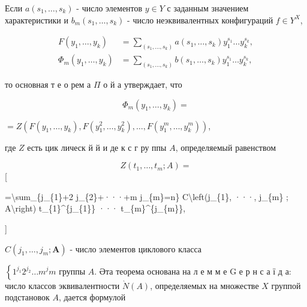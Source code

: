 \documentclass[10pt]{article}
\begin{document}
Если $a\left(s_{1}, \ldots, s_{k}\right)$ - число элементов $y \in Y$ с заданным значением характеристики и $b_{m}\left(s_{1}, \ldots, s_{k}\right)$ - число неэквивалентных конфигураций $f \in Y^{X}$,



\[

\begin{aligned}

F\left(y_{1}, \ldots, y_{k}\right) & =\sum_{\left(s_{1}, \ldots, s_{k}\right)} a\left(s_{1}, \ldots, s_{k}\right) y_{1}^{s_{1}} \ldots y_{k}^{s_{k}}, \\

\Phi_{m}\left(y_{1}, \ldots, y_{k}\right) & =\sum_{\left(s_{1}, \ldots, s_{k}\right)} b\left(s_{1}, \ldots, s_{k}\right) y_{1}^{s_{1}} \ldots y_{k}^{s_{k}},

\end{aligned}

\]



то основная т е о рем а $\Pi$ о й а утверждает, что



\[

\Phi_{m}\left(y_{1}, \ldots, y_{k}\right)=

\]



$=Z\left(F\left(y_{1}, \ldots, y_{k}\right), F\left(y_{1}^{2}, \ldots, y_{k}^{2}\right), \ldots, F\left(y_{1}^{m}, \ldots, y_{k}^{m}\right)\right)$,



где $Z$ есть цик лическ й й и де к с г ру ппы $A$, определяемый равенством



\[

Z\left(t_{1}, \ldots, t_{m} ; A\right)=

\][



=\textbackslash sum\_\{j\_\{1\}+2 j\_\{2\}+···+m j\_\{m\}=n\} C\textbackslash left(j\_\{1\}, ···, j\_\{m\} ; A\textbackslash right) t\_\{1\}\^{}\{j\_\{1\}\} ··· t\_\{m\}\^{}\{j\_\{m\}\},

]



$C\left(j_{1}, \ldots, j_{m} ; \boldsymbol{A}\right)$ - число элементов циклового класса



$\left\{1^{j_{1}} 2^{j_{2}} \ldots m^{j} m\right.$ группы $A$. Әта теорема основана на л е м м е $\mathrm{G}$ е р н с а ї д а: число классов эквивалентности $\grave{N}(A)$, определяемых на множестве $X$ группой подстановок $A$, дается формулой
\end{document}
